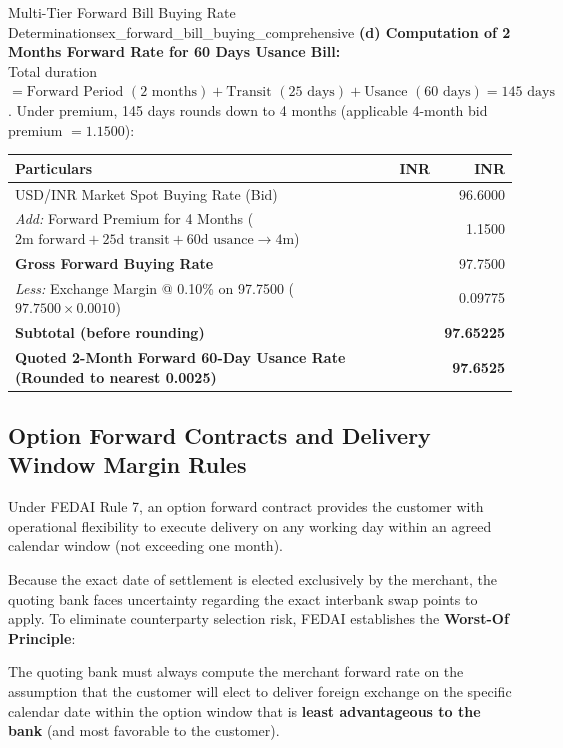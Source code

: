 \begin{example}{Multi-Tier Forward Bill Buying Rate Determinations}{ex_forward_bill_buying_comprehensive}
\noindent\textbf{(d) Computation of 2 Months Forward Rate for 60 Days Usance Bill:}\\
Total duration $= \text{Forward Period } (2 \text{ months}) + \text{Transit } (25 \text{ days}) + \text{Usance } (60 \text{ days}) = 145 \text{ days}$. Under premium, 145 days rounds down to 4 months (applicable 4-month bid premium $= 1.1500$):
\begin{center}
\begin{tabularx}{0.96\linewidth}{Xrr}
    \toprule
    \textbf{Particulars} & \textbf{INR} & \textbf{INR} \\
    \midrule
    USD/INR Market Spot Buying Rate (Bid) & & 96.6000 \\
    \textit{Add:} Forward Premium for 4 Months ($2\text{m forward} + 25\text{d transit} + 60\text{d usance} \to 4\text{m}$) & & 1.1500 \\
    \midrule
    \textbf{Gross Forward Buying Rate} & & 97.7500 \\
    \textit{Less:} Exchange Margin @ 0.10\% on 97.7500 ($97.7500 \times 0.0010$) & & 0.09775 \\
    \midrule
    \textbf{Subtotal (before rounding)} & & \textbf{97.65225} \\
    \textbf{Quoted 2-Month Forward 60-Day Usance Rate (Rounded to nearest 0.0025)} & & \textbf{97.6525} \\
    \bottomrule
\end{tabularx}
\end{center}
\end{example}

\subsection{Option Forward Contracts and Delivery Window Margin Rules}
Under FEDAI Rule 7, an option forward contract provides the customer with operational flexibility to execute delivery on any working day within an agreed calendar window (not exceeding one month). 

Because the exact date of settlement is elected exclusively by the merchant, the quoting bank faces uncertainty regarding the exact interbank swap points to apply. To eliminate counterparty selection risk, FEDAI establishes the \textbf{Worst-Of Principle}:

\begin{center}
\begin{minipage}{0.92\linewidth}
\begin{remarkbox}
The quoting bank must always compute the merchant forward rate on the assumption that the customer will elect to deliver foreign exchange on the specific calendar date within the option window that is \textbf{least advantageous to the bank} (and most favorable to the customer).
\end{remarkbox}
\end{minipage}
\end{center}

